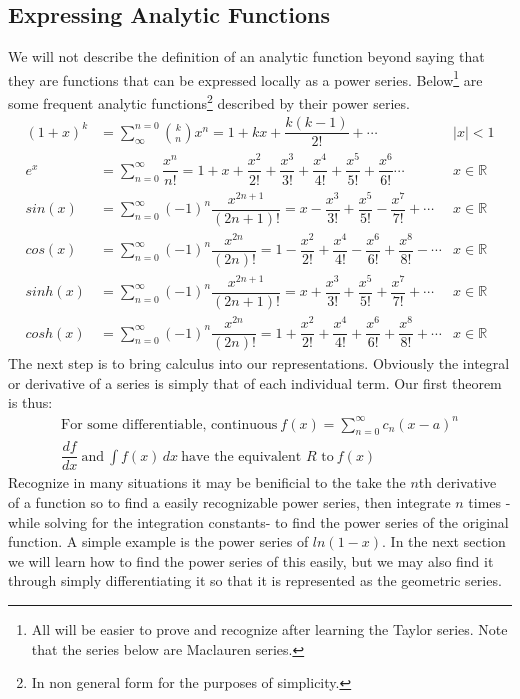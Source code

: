 \documentclass[11pt]{article}
\newcommand{\abs}[1]{\left| #1 \right|}
\newcommand{\inreal}{\in\mathbb{R}}
\begin{document}
	\subsection*{Expressing Analytic Functions}
		We will not describe the definition of an analytic function beyond saying that they are functions that can be expressed locally as
		a power series. Below\footnote{All  will be easier to prove and recognize after learning the Taylor series. Note that 
		the series below are Maclauren series.} are some frequent analytic functions\footnote{In non general form for the purposes of simplicity.} 
		described by their power series.
			\begin{align}
				(1 + x)^k &= \sum^{n = 0}_{\infty} \binom{k}{n} x^n = 1 + kx + \dfrac{k(k-1)}{2!} + \cdots
					& \abs{x} < 1\\
				e^x &= \sum_{n = 0}^{\infty} \dfrac{x^n}{n!} = 1 + x + \dfrac{x^2}{2!} + \dfrac{x^3}{3!} + \dfrac{x^4}{4!} 
				+ \dfrac{x^5}{5!} + \dfrac{x^6}{6!}\cdots 
					&  x\inreal\\
				sin(x) &= \sum_{n = 0}^{\infty} (-1)^n \dfrac{x^{2n+1}}{(2n+1)!} = x - \dfrac{x^3}{3!} + \dfrac{x^5}{5!} - \dfrac{x^7}{7!} + \cdots
					& x\inreal \\
				cos(x) &= \sum_{n = 0}^{\infty} (-1)^n \dfrac{x^{2n}}{(2n)!} = 1 - \dfrac{x^2}{2!} + \dfrac{x^4}{4!} - \dfrac{x^6}{6!} 
				+ \dfrac{x^8}{8!} - \cdots
					& x\inreal \\
				sinh(x) &= \sum_{n = 0}^{\infty} (-1)^n \dfrac{x^{2n+1}}{(2n+1)!} = x + \dfrac{x^3}{3!} + \dfrac{x^5}{5!} + \dfrac{x^7}{7!} + \cdots
					& x\inreal \\
				cosh(x) &= \sum_{n = 0}^{\infty} (-1)^n \dfrac{x^{2n}}{(2n)!} = 1 + \dfrac{x^2}{2!} + \dfrac{x^4}{4!} + \dfrac{x^6}{6!} 
				+ \dfrac{x^8}{8!} + \cdots
					& x\inreal
			\end{align}
		The next step is to bring calculus into our representations. Obviously the integral or derivative of a series is simply that of
		each individual term. Our first theorem is thus:
			\begin{gather}
				\text{For some differentiable, continuous} \ f(x) = \sum_{n = 0}^{\infty} c_n (x - a)^n \\
				\dfrac{df}{dx} \ \text{and} \ \int f(x) \, dx \ \text{have the equivalent $R$ to} \ f(x)
			\end{gather}
		Recognize in many situations it may be benificial to the take the $n$th derivative of a function so to find a easily recognizable
		power series, then integrate $n$ times -while solving for the integration constants- to find the power series of the original function.
		A simple example is the power series of $ln(1-x)$. In the next section we will learn how to find the power series of this easily, but we 
		may also find it through simply differentiating it so that it is represented as the geometric series.
\end{document}
